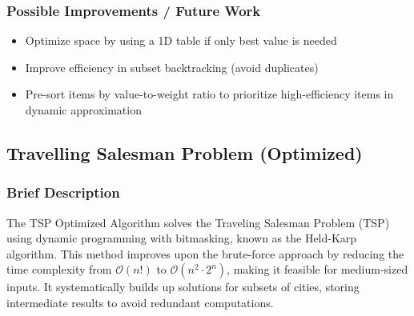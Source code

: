 \documentclass{article}
\begin{document}
\subsubsection*{Possible Improvements / Future Work}   
\begin{itemize}
    \item Optimize space by using a 1D table if only best value is needed
    \item Improve efficiency in subset backtracking (avoid duplicates)
    \item Pre-sort items by value-to-weight ratio to prioritize high-efficiency items in dynamic approximation
\end{itemize}



\subsection{Travelling Salesman Problem (Optimized)}
\subsubsection*{Brief Description}
The TSP Optimized Algorithm solves the Traveling Salesman Problem (TSP) using dynamic programming with bitmasking, known as the Held-Karp algorithm. This method improves upon the brute-force approach by reducing the time complexity from $\mathcal{O}(n!)$ to $\mathcal{O}(n^2 \cdot 2^n)$, making it feasible for medium-sized inputs. It systematically builds up solutions for subsets of cities, storing intermediate results to avoid redundant computations.
\end{document}
